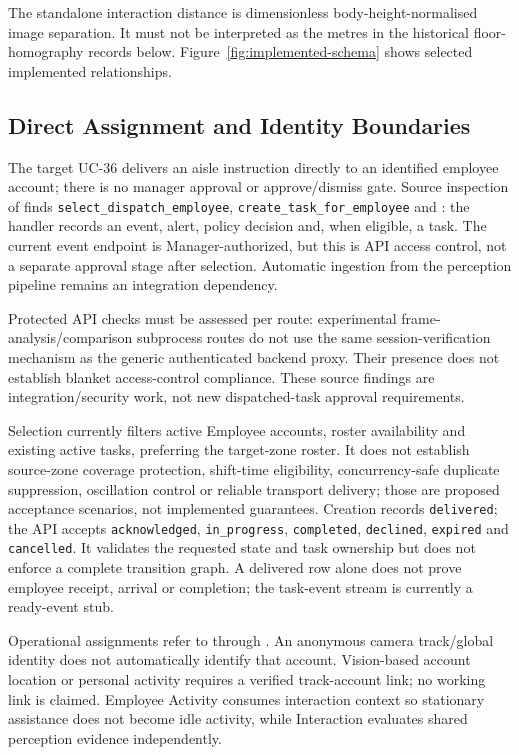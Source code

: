 The standalone interaction distance is dimensionless body-height-normalised image separation. It must not be interpreted as the metres in the historical floor-homography records below. Figure~\ref{fig:implemented-schema} shows selected implemented relationships.

\subsection{Direct Assignment and Identity Boundaries}
The target UC-36 delivers an aisle instruction directly to an identified employee account; there is no manager approval or approve/dismiss gate. Source inspection of  finds \texttt{select\_dispatch\_employee}, \texttt{create\_task\_for\_employee} and : the handler records an event, alert, policy decision and, when eligible, a task. The current event endpoint is Manager-authorized, but this is API access control, not a separate approval stage after selection. Automatic ingestion from the perception pipeline remains an integration dependency.

Protected API checks must be assessed per route: experimental frame-analysis/comparison subprocess routes do not use the same session-verification mechanism as the generic authenticated backend proxy. Their presence does not establish blanket access-control compliance. These source findings are integration/security work, not new dispatched-task approval requirements.

Selection currently filters active Employee accounts, roster availability and existing active tasks, preferring the target-zone roster. It does not establish source-zone coverage protection, shift-time eligibility, concurrency-safe duplicate suppression, oscillation control or reliable transport delivery; those are proposed acceptance scenarios, not implemented guarantees. Creation records \texttt{delivered}; the API accepts \texttt{acknowledged}, \texttt{in\_progress}, \texttt{completed}, \texttt{declined}, \texttt{expired} and \texttt{cancelled}. It validates the requested state and task ownership but does not enforce a complete transition graph. A delivered row alone does not prove employee receipt, arrival or completion; the task-event stream is currently a ready-event stub.

Operational assignments refer to  through . An anonymous camera track/global identity does not automatically identify that account. Vision-based account location or personal activity requires a verified track-account link; no working link is claimed. Employee Activity consumes interaction context so stationary assistance does not become idle activity, while Interaction evaluates shared perception evidence independently.


